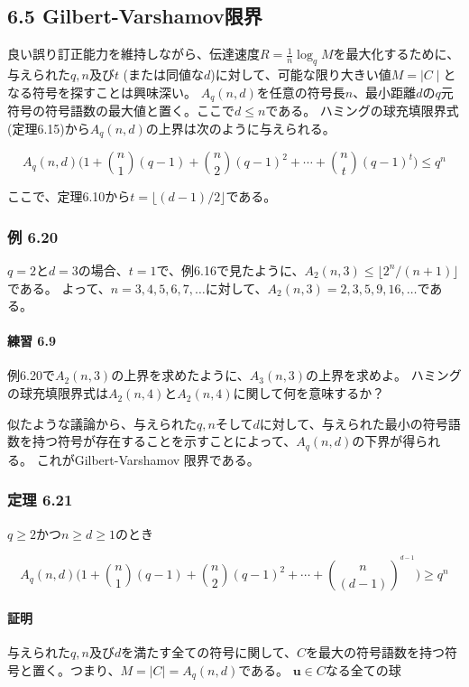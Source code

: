 \documentclass[12pt,a4paper]{article}
\begin{document}
  \subsection*{6.5 Gilbert-Varshamov限界}
    
    良い誤り訂正能力を維持しながら、伝達速度$R = \frac{1}{n} \log_q M$を最大化するために、与えられた$q, n$及び$t $ (または同値な$d$)に対して、可能な限り大きい値$M = \mid C \mid $となる符号を探すことは興味深い。
    $A_q (n, d)$を任意の符号長$n$、最小距離$d$の$q$元符号の符号語数の最大値と置く。ここで$d \leq n$である。
    ハミングの球充填限界式 (定理6.15)から$A_q (n, d)$の上界は次のように与えられる。

    \[A_q (n, d) \big(1 + \binom n1 (q - 1) + \binom n2 {(q - 1)}^2 + \cdots + \binom nt {(q - 1)}^t \big) \leq q^n\]

    ここで、定理6.10から$t = \lfloor (d - 1) / 2 \rfloor$である。

    \subsubsection*{例 6.20}
      
    $q = 2$と$d = 3$の場合、$t = 1$で、例6.16で見たように、$A_2 (n, 3) \leq \lfloor 2^n / (n + 1) \rfloor$である。
    よって、$n = 3, 4, 5, 6, 7, \dots $に対して、$A_2 (n, 3) = 2, 3, 5, 9, 16, \dots $である。

      \paragraph{練習 6.9}
        
      例6.20で$A_2 (n, 3)$の上界を求めたように、$A_3(n, 3)$の上界を求めよ。
      ハミングの球充填限界式は$A_2 (n, 4)$と$A_2 (n,4)$に関して何を意味するか？

    似たような議論から、与えられた$q, n$そして$d$に対して、与えられた最小の符号語数を持つ符号が存在することを示すことによって、$A_q(n, d)$の下界が得られる。
    これがGilbert-Varshamov 限界である。

    \subsubsection*{定理 6.21}
      $q \geq 2$かつ$n \geq d \geq 1$のとき

      \[A_q (n, d) \big( 1 + \binom n1 (q - 1) + \binom n2 {(q- 1)}^2 + \cdots + \binom{n}{(d - 1)}^{^{d -1} } \big) \geq q^n \]

      \paragraph{証明}
      与えられた$q, n$及び$d$を満たす全ての符号に関して、$C$を最大の符号語数を持つ符号と置く。つまり、$M = \mid C \mid = A_q (n, d)$である。
      $\mathbf{u} \in C$なる全ての球
\end{document}
